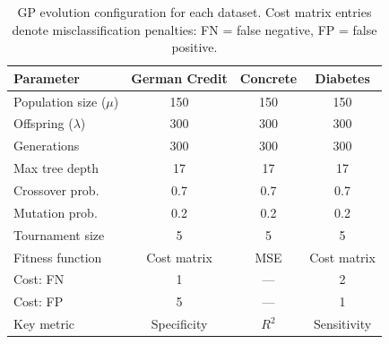 \begin{table}[ht]
  \centering
  \caption{GP evolution configuration for each dataset. Cost matrix entries denote misclassification penalties: FN = false negative, FP = false positive.}
  \label{tab:gp-config}
  \begin{tabular}{@{}lccc@{}}
    \toprule
    \textbf{Parameter} & \textbf{German Credit} & \textbf{Concrete} & \textbf{Diabetes} \\
    \midrule
    Population size ($\mu$) & 150 & 150 & 150 \\
    Offspring ($\lambda$) & 300 & 300 & 300 \\
    Generations & 300 & 300 & 300 \\
    Max tree depth & 17 & 17 & 17 \\
    Crossover prob. & 0.7 & 0.7 & 0.7 \\
    Mutation prob. & 0.2 & 0.2 & 0.2 \\
    Tournament size & 5 & 5 & 5 \\
    \midrule
    Fitness function & Cost matrix & MSE & Cost matrix \\
    Cost: FN & 1 & --- & 2 \\
    Cost: FP & 5 & --- & 1 \\
    Key metric & Specificity & $R^2$ & Sensitivity \\
    \bottomrule
  \end{tabular}
\end{table}